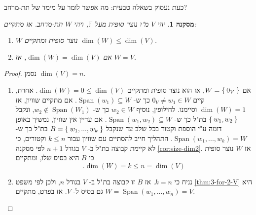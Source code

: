 \documentclass[12pt]{report}
\theoremstyle{plain}
\newtheorem{corollary}[theorem]{מסקנה}
\theoremstyle{definition}
\newcommand{\F}{\mathbb{F}}
\newcommand{\0}{\mathbf{0}}
\DeclareMathOperator{\Span}{Span}
\begin{document}
כעת נעסוק בשאלה טבעית: מה אפשר לומר על מימד של תת-מרחב?

\begin{corollary}\label{cor:subspace-dim}
יהי
$V$
מ"ו נוצר סופית מעל
$\F$,
ויהי
$W$
תת-מרחב. אז מתקיים:

\begin{enumerate}[label=\alph*.]
\item 
$W$
נוצר סופית ומתקיים
$\dim(W)\leq \dim(V)$.


\item
אם
$\dim(W)=\dim(V)$,
אז 
$W=V$.


\end{enumerate}
\end{corollary}

\begin{proof}
נסמן
$\dim(V)=n$.
\begin{enumerate}[label=\alph*.]
\item
אם 
$W=\Set{0_V}$,
אז הוא נוצר סופית ומתקיים 
$\dim(W)=0\leq\dim(V)$.
אחרת, קיים
$0_V\neq w_1\in W$
כך ש-
$\Span(w_1)\subseteq W$.
אם מתקיים שוויון, אז
$\dim(W)=1$
וסיימנו. לחילופין, נוסיף 
$w_2\in W$
כך ש-
$w_2\notin\Span(W_1)$,
ונקבל
$\Set{w_1,w_2}$
בת"ל כך ש-
$\Span(w_1,w_2)\subseteq W$.
אם עדיין אין שוויון, נמשיך באופן דומה ע"י הוספת וקטור בכל שלב עד שנקבל
$B=\Set{w_1,...,w_k}$
בת"ל כך ש-
$\Span(w_1,...,w_k)=W$.
התהליך חייב להסתיים עם שוויון עבור
$k\leq n$
וקטורים, כי לא קיימת קבוצה בת"ל ב-
$V$
בגודל
$n+1$
לפי מסקנה
\ref{cor:size-dim2}.
אז
$W$
נוצר סופית כי
$B$
היא בסיס שלו, ומתקיים
$$.\dim(W)=k\leq n=\dim(V)$$


\item
נניח כי
$k=n$.
אז
$B$
זו קבוצה בת"ל ב-
$V$
בגודל
$n$,
ולכן לפי משפט
\ref{thm:3-for-2-V}
היא גם בסיס ל-
$V$.
אז בפרט, מתקיים
$W=\Span(w_1,...,w_n)=V$.


\end{enumerate}
\end{proof}
\end{document}
